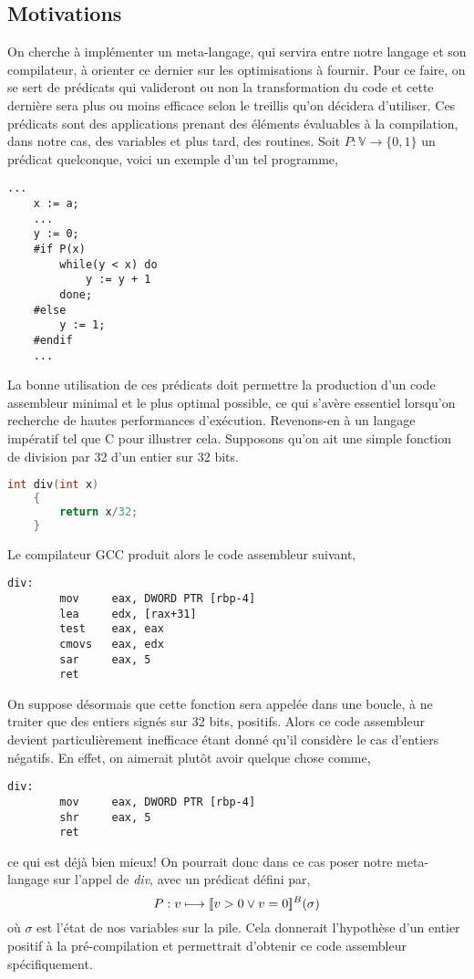 \documentclass[a4paper, 11pt]{article}
\begin{document}
\subsection{Motivations}
On cherche à implémenter un meta-langage, qui servira entre notre langage et son compilateur, à orienter
ce dernier sur les optimisations à fournir. Pour ce faire, on se sert de prédicats qui valideront ou non la
transformation du code et cette dernière sera plus ou moins efficace selon le treillis qu'on décidera d'utiliser. 
Ces prédicats sont des applications prenant des éléments évaluables à la compilation, 
dans notre cas, des variables et plus tard, des routines.
Soit $P : \mathbb{V} \longrightarrow \{0, 1\}$ un prédicat quelconque, voici un exemple d'un tel programme,
\begin{lstlisting}[tabsize=2]
	...
	x := a;
	...
	y := 0;
	#if P(x)
		while(y < x) do
			y := y + 1
		done;
	#else
		y := 1;
	#endif
	...
\end{lstlisting}
La bonne utilisation de ces prédicats doit permettre la production d'un code assembleur minimal et le plus
optimal possible, ce qui s'avère essentiel lorsqu'on recherche de hautes performances d'exécution.
Revenons-en à un langage impératif tel que C pour illustrer cela. Supposons qu'on ait une simple fonction de division 
par 32 d'un entier sur 32 bits.
\begin{lstlisting}[tabsize=2, language=c]
	int div(int x)
	{
		return x/32;
	}
\end{lstlisting}
Le compilateur GCC produit alors le code assembleur suivant,
\begin{lstlisting}[tabsize=2]
	div:
		mov     eax, DWORD PTR [rbp-4]
		lea     edx, [rax+31]
		test    eax, eax
		cmovs   eax, edx
		sar     eax, 5
		ret
\end{lstlisting}
On suppose désormais que cette fonction sera appelée dans une boucle, à ne traiter que des entiers signés sur 32 bits, positifs.
Alors ce code assembleur devient particulièrement inefficace étant donné qu'il considère le cas d'entiers
négatifs. En effet, on aimerait plutôt avoir quelque chose comme,
\begin{lstlisting}[tabsize=2]
	div:
		mov     eax, DWORD PTR [rbp-4]
		shr     eax, 5
		ret
\end{lstlisting}
ce qui est déjà bien mieux! On pourrait donc dans ce cas poser notre meta-langage sur l'appel de \textit{div}, avec un prédicat
défini par,
\[P : v \longmapsto [\![{v > 0 \vee v = 0}]\!]^{B}(\sigma)\]
où $\sigma$ est l'état de nos variables sur la pile. Cela donnerait l'hypothèse d'un entier positif à la pré-compilation
et permettrait d'obtenir ce code assembleur spécifiquement.
\end{document}
